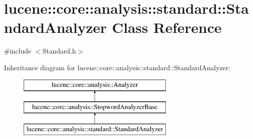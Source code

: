 \hypertarget{classlucene_1_1core_1_1analysis_1_1standard_1_1StandardAnalyzer}{}\section{lucene\+:\+:core\+:\+:analysis\+:\+:standard\+:\+:Standard\+Analyzer Class Reference}
\label{classlucene_1_1core_1_1analysis_1_1standard_1_1StandardAnalyzer}


{\ttfamily \#include $<$Standard.\+h$>$}

Inheritance diagram for lucene\+:\+:core\+:\+:analysis\+:\+:standard\+:\+:Standard\+Analyzer\+:\begin{figure}[H]
\begin{center}
\leavevmode
\includegraphics[height=3.000000cm]{classlucene_1_1core_1_1analysis_1_1standard_1_1StandardAnalyzer}
\end{center}
\end{figure}
